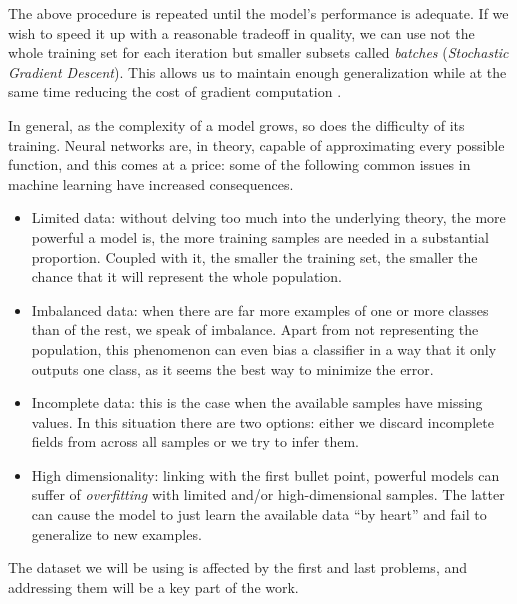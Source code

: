     The above procedure is repeated until the model's performance is adequate. If we wish to speed it up with a reasonable tradeoff in quality, we can use not the whole training set for each iteration but smaller subsets called \textit{batches} (\textit{Stochastic Gradient Descent}). This allows us to maintain enough generalization while at the same time reducing the cost of gradient computation \cite{lecun-dl}.

    In general, as the complexity of a model grows, so does the difficulty of its training. Neural networks are, in theory, capable of approximating every possible function, and this comes at a price: some of the following common issues in machine learning \cite{nn-atc} have increased consequences.

    \begin{itemize}

    	\item
    	Limited data: without delving too much into the underlying theory, the more powerful a model is, the more training samples are needed in a substantial proportion. Coupled with it, the smaller the training set, the smaller the chance that it will represent the whole population.

    	\item
    	Imbalanced data: when there are far more examples of one or more classes than of the rest, we speak of imbalance. Apart from not representing the population, this phenomenon can even bias a classifier in a way that it only outputs one class, as it seems the best way to minimize the error.

    	\item
    	Incomplete data: this is the case when the available samples have missing values. In this situation there are two options: either we discard incomplete fields from across all samples or we try to infer them.

    	\item
    	High dimensionality: linking with the first bullet point, powerful models can suffer of \textit{overfitting} with limited and/or high-dimensional samples. The latter can cause the model to just learn the available data ``by heart'' and fail to generalize to new examples.

    \end{itemize}

    The dataset we will be using is affected by the first and last problems, and addressing them will be a key part of the work.